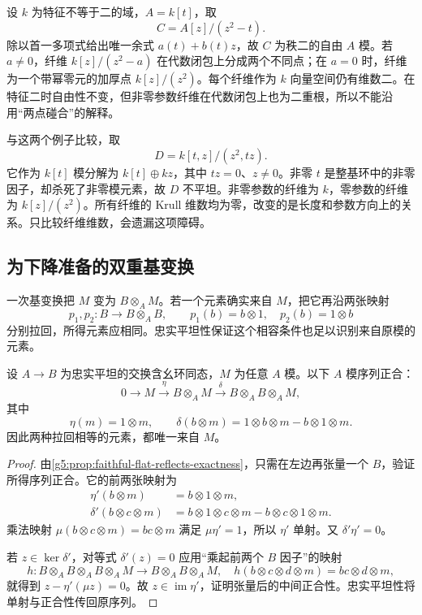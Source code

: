 \begin{example}\label{g5:exm:flat-two-points-collision}
	设 \(k\) 为特征不等于二的域，\(A=k[t]\)，取
	\[
		C=A[z]/(z^2-t).
	\]
	除以首一多项式给出唯一余式 \(a(t)+b(t)z\)，故 \(C\) 为秩二的自由 \(A\) 模。若 \(a\ne0\)，纤维 \(k[z]/(z^2-a)\) 在代数闭包上分成两个不同点；在 \(a=0\) 时，纤维为一个带幂零元的加厚点 \(k[z]/(z^2)\)。每个纤维作为 \(k\) 向量空间仍有维数二。在特征二时自由性不变，但非零参数纤维在代数闭包上也为二重根，所以不能沿用“两点碰合”的解释。
\end{example}

与这两个例子比较，取
\[
	D=k[t,z]/(z^2,tz).
\]
它作为 \(k[t]\) 模分解为 \(k[t]\oplus k z\)，其中 \(t z=0\)、\(z\ne0\)。非零 \(t\) 是整基环中的非零因子，却杀死了非零模元素，故 \(D\) 不平坦。非零参数的纤维为 \(k\)，零参数的纤维为 \(k[z]/(z^2)\)。所有纤维的 Krull 维数均为零，改变的是长度和参数方向上的关系。只比较纤维维数，会遗漏这项障碍。

\subsection{为下降准备的双重基变换}
\label{g5:subsec:0604:05}

一次基变换把 \(M\) 变为 \(B\otimes_A M\)。若一个元素确实来自 \(M\)，把它再沿两张映射
\[
	p_1,p_2:B\longrightarrow B\otimes_A B,\qquad
	p_1(b)=b\otimes1,\quad p_2(b)=1\otimes b
\]
分别拉回，所得元素应相同。忠实平坦性保证这个相容条件也足以识别来自原模的元素。

\begin{theorem}\label{g5:thm:faithful-flat-equalizer}
	设 \(A\to B\) 为忠实平坦的交换含幺环同态，\(M\) 为任意 \(A\) 模。以下 \(A\) 模序列正合：
	\[
		0\longrightarrow M\xrightarrow{\eta}
		B\otimes_A M\xrightarrow{\delta}
		B\otimes_A B\otimes_A M,
	\]
	其中
	\[
		\eta(m)=1\otimes m,\qquad
		\delta(b\otimes m)=1\otimes b\otimes m-b\otimes1\otimes m.
	\]
	因此两种拉回相等的元素，都唯一来自 \(M\)。
\end{theorem}
\begin{proof}
	由\cref{g5:prop:faithful-flat-reflects-exactness}，只需在左边再张量一个 \(B\)，验证所得序列正合。它的前两张映射为
	\[
		\begin{aligned}
			\eta'(b\otimes m)&=b\otimes1\otimes m,\\
			\delta'(b\otimes c\otimes m)
			&=b\otimes1\otimes c\otimes m
			-b\otimes c\otimes1\otimes m.
		\end{aligned}
	\]
	乘法映射 \(\mu(b\otimes c\otimes m)=bc\otimes m\) 满足 \(\mu\eta'=1\)，所以 \(\eta'\) 单射。又 \(\delta'\eta'=0\)。

	若 \(z\in\ker\delta'\)，对等式 \(\delta'(z)=0\) 应用“乘起前两个 \(B\) 因子”的映射
	\[
		h:B\otimes_A B\otimes_A B\otimes_A M
		\longrightarrow B\otimes_A B\otimes_A M,
		\quad
		h(b\otimes c\otimes d\otimes m)=bc\otimes d\otimes m,
	\]
	就得到 \(z-\eta'(\mu z)=0\)。故 \(z\in\operatorname{im}\eta'\)，证明张量后的中间正合性。忠实平坦性将单射与正合性传回原序列。
\end{proof}

